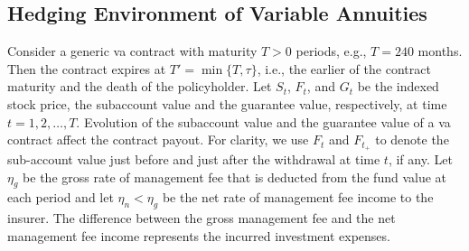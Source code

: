 \subsection{Hedging Environment of Variable Annuities} \label{subsec:VASimulation}

Consider a generic \gls{va} contract with maturity $T>0$ periods, e.g., $T=240$ months.
Then the contract expires at $T'=\min\{T,\tau\}$, i.e., the earlier of the contract maturity and the death of the policyholder.
Let $S_t$, $F_t$, and $G_t$ be the indexed stock price, the subaccount value and the guarantee value, respectively, at time $t=1,2,\ldots,T$.
Evolution of the subaccount value and the guarantee value of a \gls{va} contract affect the contract payout.
For clarity, we use $F_t$ and $F_{t_+}$ to denote the sub-account value just before and just after the withdrawal at time $t$, if any.
Let $\eta_g$ be the gross rate of management fee that is deducted from the fund value at each period and let $\eta_n < \eta_g$ be the net rate of management fee income to the insurer.
The difference between the gross management fee and the net management fee income represents the incurred investment expenses.

